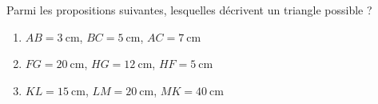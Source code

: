
\begin{exercice}\label{exosmath-0850}

    Parmi les propositions suivantes, lesquelles décrivent un triangle possible ?
    \begin{enumerate}
        \item
            \( AB=\SI{3}{\centi\meter}\), \( BC=\SI{5}{\centi\meter}\), \( AC=\SI{7}{\centi\meter}\)
        \item
            \( FG=\SI{20}{\centi\meter}\), \( HG=\SI{12}{\centi\meter}\), \( HF=\SI{5}{\centi\meter}\)
        \item
            \( KL=\SI{15}{\centi\meter}\), \( LM=\SI{20}{\centi\meter}\), \( MK=\SI{40}{\centi\meter}\)
    \end{enumerate}

\end{exercice}
